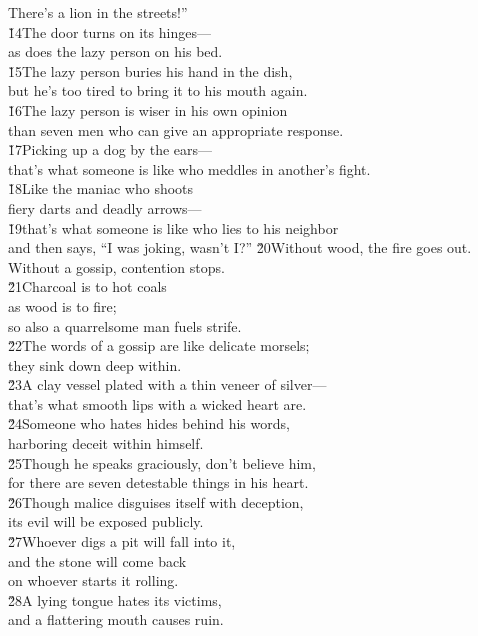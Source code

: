 \begin{poetry}
\poemll    There's a lion in the streets!'' \\
\poeml \v{14}The door turns on its hinges--- \\
\poemll    as does the lazy person on his bed. \\
\poeml \v{15}The lazy person buries his hand in the dish, \\
\poemll    but he's too tired to bring it to his mouth again. \\
\poeml \v{16}The lazy person is wiser in his own opinion \\
\poemll    than seven men who can give an appropriate response. \\
\poeml \v{17}Picking up a dog by the ears--- \\
\poemll    that's what someone is like who meddles in another's fight. \\
\poeml \v{18}Like the maniac who shoots \\
\poemll    fiery darts and deadly arrows--- \\
\poeml \v{19}that's what someone is like who lies to his neighbor \\
\poemll    and then says, ``I was joking, wasn't I?''
\poeml \v{20}Without wood, the fire goes out. \\
\poemll    Without a gossip, contention stops. \\
\poeml \v{21}Charcoal is to hot coals \\
\poemll    as wood is to fire; \\
\poemlll       so also a quarrelsome man fuels strife. \\
\poeml \v{22}The words of a gossip are like delicate morsels; \\
\poemll    they sink down deep within. \\
\poeml \v{23}A clay vessel plated with a thin veneer of silver--- \\
\poemll    that's what smooth lips with a wicked heart are. \\
\poeml \v{24}Someone who hates hides behind his words, \\
\poemll    harboring deceit within himself. \\
\poeml \v{25}Though he speaks graciously, don't believe him, \\
\poemll    for there are seven detestable things in his heart. \\
\poeml \v{26}Though malice disguises itself with deception, \\
\poemll    its evil will be exposed publicly. \\
\poeml \v{27}Whoever digs a pit will fall into it, \\
\poemll    and the stone will come back \\
\poemlll       on whoever starts it rolling. \\
\poeml \v{28}A lying tongue hates its victims, \\
\poemll    and a flattering mouth causes ruin.
\end{poetry}

